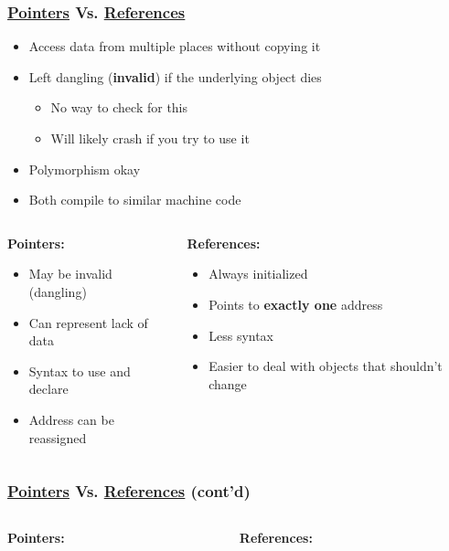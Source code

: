 \documentclass[glossy]{beamer}
\newcommand{\cppref}[2]{\href{http://en.cppreference.com/w/cpp/#1}{\underline{#2}}}
\begin{document}
\begin{frame}[fragile=singleslide]
  \frametitle{\cppref{language/pointer}{Pointers} Vs. \cppref{language/reference}{References}}

  \begin{itemize}
    \item Access data from multiple places without copying it
    \item Left dangling (\textbf{invalid}) if the underlying object dies
    \begin{itemize}
      \item No way to check for this
      \item Will likely crash if you try to use it
    \end{itemize}
    \item Polymorphism okay
    \item Both compile to similar machine code
  \end{itemize}

  \begin{columns}
    \begin{column}{6cm}
      \textbf{Pointers:}
      \begin{itemize}
        \item May be invalid (dangling)
        \item Can represent lack of data
        \item Syntax to use and declare
        \item Address can be reassigned
      \end{itemize}
    \end{column}

    \begin{column}{6cm}
      \textbf{References:}
      \begin{itemize}
        \item Always initialized
        \item Points to \textbf{exactly one} address
        \item Less syntax
        \item Easier to deal with objects that shouldn't change
      \end{itemize}
    \end{column}
  \end{columns}
\end{frame}


\begin{frame}[fragile=singleslide]
  \frametitle{\cppref{language/pointer}{Pointers} Vs. \cppref{language/reference}{References} (cont'd)}
  \begin{columns}[t]
    \begin{column}{6cm}
      \textbf{Pointers:}
    \end{column}

    \begin{column}{6cm}
      \textbf{References:}
    \end{column}
  \end{columns}
\end{frame}
\end{document}

